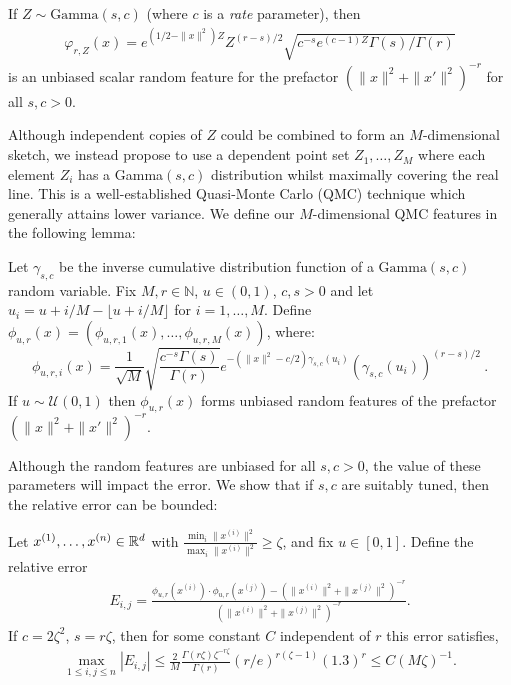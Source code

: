 \begin{lemma}\label{scalar prefactor features lemma}
    If  $Z\sim\mathrm{Gamma}(s,c)$ (where $c$ is a \emph{rate} parameter), then
    \begin{align}
        \varphi_{r,Z}(x) = e^{(1/2-\|x\|^2)Z} Z^{(r-s)/2}\sqrt{c^{-s}e^{(c-1)Z}\Gamma(s)/{\Gamma(r)}}
    \end{align}
     is an unbiased scalar random feature for the prefactor $(\|x\|^2 + \|x'\|^2)^{-r}$
    for all $s,c>0$.
\end{lemma}
Although independent copies of $Z$ could be combined to form an $M$-dimensional sketch,
we instead propose to use a dependent point set $Z_1,\dots,Z_M$ where each element $Z_i$ has a Gamma$(s,c)$ distribution whilst maximally covering the real line. This is a well-established Quasi-Monte Carlo (QMC) technique which generally attains
lower variance. 
We define our $M$-dimensional QMC features in the following lemma:
\begin{lemma}\label{lemma:def QMC prefactor features}
     Let $\gamma_{s,c}$ be the inverse cumulative distribution function of a $\mathrm{Gamma}(s,c)$ random variable.
     Fix $M,r\in\mathbb{N}$, $u\in(0,1)$, $c,s>0$ and let $u_i = u + i/M - \lfloor u + i/M\rfloor$ for $i=1,\dots,M$.
     Define $\phi_{u,r}(x) = (\phi_{u,r,1}(x),\dots,\phi_{u,r,M}(x))$, where:
     \begin{equation}
         \phi_{u,r,i}(x) =\frac{1}{\sqrt M}\sqrt{\frac{c^{-s}\Gamma(s)}{\Gamma(r)} } e^{-(\|x\|^2-c/2)\gamma_{s,c}(u_i) }(\gamma_{s,c}(u_i))^{(r-s)/2}\ .
     \end{equation}
     If $u\sim\mathcal U(0,1)$ then $\phi_{u,r}(x)$ forms unbiased random features of the prefactor $(\|x\|^2 + \|x'\|^2)^{-r}$.
\end{lemma}
Although the random features are unbiased for all $s,c>0$, the value of these parameters will impact the error.
We show that if $s,c$ are suitably tuned, then the relative error can be bounded:
 \begin{lemma} \label{QMC error}
Let $x^{(1)},\dots,x^{(n)}\in \mathbb{R}^d$ with $\frac{\min_i \|x^{(i)}\|^2}{\max_i \|x^{(i)}\|^2} \ge \zeta$, and fix $u\in[0,1]$. Define the relative error
\begin{align}
    \label{error matrix}
E_{i,j} = \frac{   \phi_{u,r}(  x^{(i)} )\cdot \phi_{u,r}( x^{(j)} ) - (\| x^{(i)} \| ^2+ \| x^{(j)} \| ^2)^{-r} }{( \| x^{(i)} \| ^2+ \| x^{(j)} \| ^2)^{-r}} .
\end{align}
If $c = 2\zeta^2$, $s=r\zeta$, then 
for some constant $C$ independent of $r$
this error satisfies, 
\begin{align}
\max_{1\le i,j \le n} | E_{i,j}| \leq \frac{2}{M} \frac{\Gamma(r\zeta)\zeta^{-r\zeta}}{\Gamma(r)} (r/e)^{r(\zeta-1)} (1.3)^r \leq C (M\zeta)^{-1}.
\end{align}
\end{lemma}

